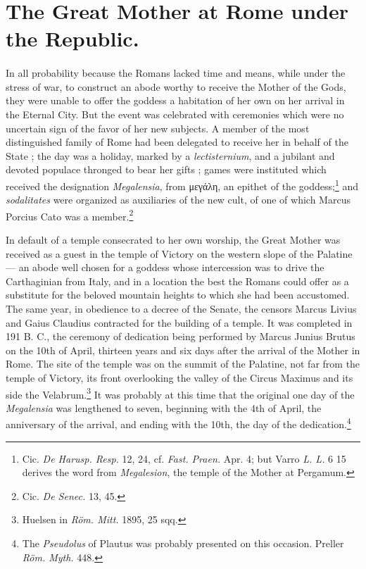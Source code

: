 \documentclass[a4paper, 11pt, oneside, polutonikogreek, english]{article}
\begin{document}
\section{The Great Mother at Rome under the Republic.}
\paragraph{}
In all probability because the Romans lacked time and means, while under the stress of war, to construct an abode worthy to receive the Mother of the Gods, they were unable to offer the goddess a habitation of her own on her arrival in the Eternal City. But the event was celebrated with ceremonies which were no uncertain sign of the favor of her new subjects. A member of the most distinguished family of Rome had been delegated to receive her in behalf of the State ; the day was a holiday, marked by a \emph{lectisternium}, and a jubilant and devoted populace thronged to bear her gifts ; games were instituted which received the designation \emph{Megalensia}, from μεγάλη, an epithet of the goddess;\footnote{Cic. \emph{De Harusp. Resp.} 12, 24, cf. \emph{Fast. Praen.} Apr. 4; but Varro \emph{L. L.} 6 15 derives the word from \emph{Megalesion}, the temple of the Mother at Pergamum.} and \emph{sodalitates} were organized as auxiliaries of the new cult, of one of which Marcus Porcius Cato was a member.\footnote{Cic. \emph{De Senec.} 13, 45.}

In default of a temple consecrated to her own worship, the Great Mother was received as a guest in the temple of Victory on the western slope of the Palatine --- an abode well chosen for a goddess whose intercession was to drive the Carthaginian from Italy, and in a location the best the Romans could offer as a substitute for the beloved mountain heights to which she had been accustomed. The same year, in obedience to a decree of the Senate, the censors Marcus Livius and Gaius Claudius contracted for the building of a temple. It was completed in 191 B. C., the ceremony of dedication being performed by Marcus Junius Brutus on the 10th of April, thirteen years and six days after the arrival of the Mother in Rome. The site of the temple was on the summit of the Palatine, not far from the temple of Victory, its front overlooking the valley of the Circus Maximus and its side the Velabrum.\footnote{Huelsen in \emph{Röm. Mitt.} 1895, 25 sqq.} It was probably at this time that the original one day of the \emph{Megalensia} was lengthened to seven, beginning with the 4th of April, the anniversary of the arrival, and ending with the 10th, the day of the dedication.\footnote{The \emph{Pseudolus} of Plautus was probably presented on this occasion. Preller \emph{Röm. Myth.} 448.}
\end{document}
